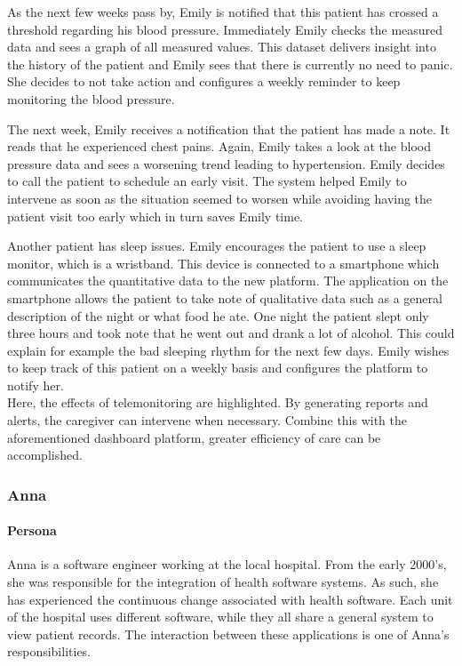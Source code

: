         As the next few weeks pass by, Emily is notified that this patient has crossed a threshold regarding his blood pressure. Immediately Emily checks the measured data and sees a graph of all measured values. This dataset delivers insight into the history of the patient and Emily sees that there is currently no need to panic. She decides to not take action and configures a weekly reminder to keep monitoring the blood pressure.
        
        The next week, Emily receives a notification that the patient has made a note. It reads that he experienced chest pains. Again, Emily takes a look at the blood pressure data and sees a worsening trend leading to hypertension. Emily decides to call the patient to schedule an early visit. The system helped Emily to intervene as soon as the situation seemed to worsen while avoiding having the patient visit too early which in turn saves Emily time.
        
        Another patient has sleep issues. Emily encourages the patient to use a sleep monitor, which is a wristband. This device is connected to a smartphone which communicates the quantitative data to the new platform. The application on the smartphone allows the patient to take note of qualitative data such as a general description of the night or what food he ate. One night the patient slept only three hours and took note that he went out and drank a lot of alcohol. This could explain for example the bad sleeping rhythm for the next few days. Emily wishes to keep track of this patient on a weekly basis and configures the platform to notify her.\\

        \noindent Here, the effects of telemonitoring are highlighted. By generating reports and alerts, the caregiver can intervene when necessary. Combine this with the aforementioned dashboard platform, greater efficiency of care can be accomplished.

        \subsubsection{Anna}

        \paragraph{Persona} Anna is a software engineer working at the local hospital. From the early 2000's, she was responsible for the integration of health software systems. As such, she has experienced the continuous change associated with health software. Each unit of the hospital uses different software, while they all share a general system to view patient records. The interaction between these applications is one of Anna's responsibilities.

